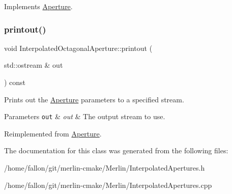 Implements \hyperlink{classAperture_a77854d058bf8a00cfeb7a6d766dc0028}{Aperture}.

\mbox{\label{classInterpolatedOctagonalAperture_ad1e9dcb72289db534c78e297fa4c8197}} 
\subsubsection{\texorpdfstring{printout()}{printout()}}
{\footnotesize\ttfamily void Interpolated\+Octagonal\+Aperture\+::printout (\begin{DoxyParamCaption}\item[{std\+::ostream \&}]{out }\end{DoxyParamCaption}) const\hspace{0.3cm}{\ttfamily [virtual]}}

Prints out the \hyperlink{classAperture}{Aperture} parameters to a specified stream. 
\begin{DoxyParams}[1]{Parameters}
\mbox{\tt out}  & {\em out} & The output stream to use. \\
\hline
\end{DoxyParams}


Reimplemented from \hyperlink{classAperture_aff2f276b93bb2cb94e559e1c4901e38e}{Aperture}.



The documentation for this class was generated from the following files\+:\begin{DoxyCompactItemize}
\item 
/home/fallon/git/merlin-\/cmake/\+Merlin/Interpolated\+Apertures.\+h\item 
/home/fallon/git/merlin-\/cmake/\+Merlin/Interpolated\+Apertures.\+cpp\end{DoxyCompactItemize}
